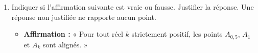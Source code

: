 \begin{enumerate}[resume]
	\item Indiquer si l’affirmation suivante est vraie ou fausse. Justifier la réponse. Une réponse non justifiée ne rapporte aucun point.
	
	\begin{itemize}
		\item \textbf{Affirmation :} « Pour tout réel $k$ strictement positif, les points $A_{0,5}$, $A_{1}$ et $A_k$ sont alignés. »
	\end{itemize}
\end{enumerate}